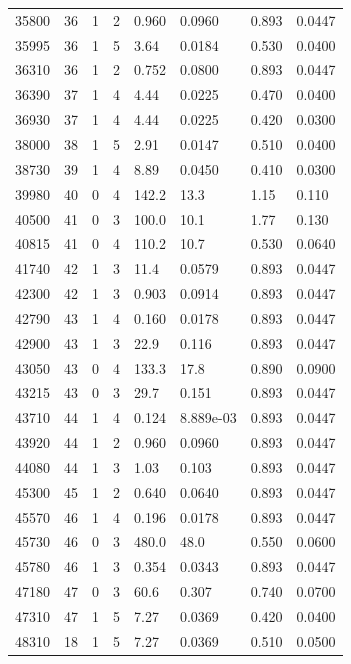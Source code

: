 \documentclass[preview]{standalone}
\begin{document}
{{{\begin{tabular}{L{1.2cm}C{1.2cm} C{0.3cm}C{0.5cm} C{1.4cm}C{1.4cm} C{1.4cm}C{1.4cm}}
  35800  &    36  & 1     &  2 &  0.960  & 0.0960  & 0.893 &  0.0447   \\ 
  35995  &    36  & 1     &  5 &  3.64  & 0.0184  & 0.530 &  0.0400   \\ 
  36310  &    36  & 1     &  2 &  0.752  & 0.0800  & 0.893 &  0.0447   \\ 
  36390  &    37  & 1     &  4 &  4.44  & 0.0225  & 0.470 &  0.0400   \\ 
  36930  &    37  & 1     &  4 &  4.44  & 0.0225  & 0.420 &  0.0300   \\ 
  38000  &    38  & 1     &  5 &  2.91  & 0.0147  & 0.510 &  0.0400   \\ 
  38730  &    39  & 1     &  4 &  8.89  & 0.0450  & 0.410 &  0.0300   \\ 
  39980  &    40  & 0     &  4 &  142.2  & 13.3  & 1.15 &  0.110   \\ 
  40500  &    41  & 0     &  3 &  100.0  & 10.1  & 1.77 &  0.130   \\ 
  40815  &    41  & 0     &  4 &  110.2  & 10.7  & 0.530 &  0.0640   \\ 
  41740  &    42  & 1     &  3 &  11.4  & 0.0579  & 0.893 &  0.0447   \\ 
  42300  &    42  & 1     &  3 &  0.903  & 0.0914  & 0.893 &  0.0447   \\ 
  42790  &    43  & 1     &  4 &  0.160  & 0.0178  & 0.893 &  0.0447   \\ 
  42900  &    43  & 1     &  3 &  22.9  & 0.116  & 0.893 &  0.0447   \\ 
  43050  &    43  & 0     &  4 &  133.3  & 17.8  & 0.890 &  0.0900   \\ 
  43215  &    43  & 0     &  3 &  29.7  & 0.151  & 0.893 &  0.0447   \\ 
  43710  &    44  & 1     &  4 &  0.124  & 8.889e-03  & 0.893 &  0.0447   \\ 
  43920  &    44  & 1     &  2 &  0.960  & 0.0960  & 0.893 &  0.0447   \\ 
  44080  &    44  & 1     &  3 &  1.03  & 0.103  & 0.893 &  0.0447   \\ 
  45300  &    45  & 1     &  2 &  0.640  & 0.0640  & 0.893 &  0.0447   \\ 
  45570  &    46  & 1     &  4 &  0.196  & 0.0178  & 0.893 &  0.0447   \\ 
  45730  &    46  & 0     &  3 &  480.0  & 48.0  & 0.550 &  0.0600   \\ 
  45780  &    46  & 1     &  3 &  0.354  & 0.0343  & 0.893 &  0.0447   \\ 
  47180  &    47  & 0     &  3 &  60.6  & 0.307  & 0.740 &  0.0700   \\ 
  47310  &    47  & 1     &  5 &  7.27  & 0.0369  & 0.420 &  0.0400   \\ 
  48310  &    18  & 1     &  5 &  7.27  & 0.0369  & 0.510 &  0.0500   \\ 
\hline 
\end{tabular} 

}}}
\end{document}
